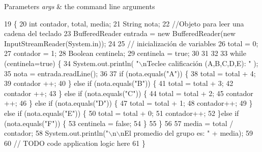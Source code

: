 \begin{DoxyParams}{Parameters}
{\em args} & the command line arguments \\
\hline
\end{DoxyParams}

\begin{DoxyCode}
19                                                               \{
20          \textcolor{keywordtype}{int} contador, total, media;
21       String nota;
22        \textcolor{comment}{//Objeto para leer una cadena del teclado}
23       BufferedReader entrada = \textcolor{keyword}{new} BufferedReader(\textcolor{keyword}{new} InputStreamReader(System.in));
24  
25       \textcolor{comment}{// inicialización de variables}
26       total = 0;
27       contador = 1;
28       Boolean centinela;
29       centinela = \textcolor{keyword}{true};
30       
31       
32   
33         \textcolor{keywordflow}{while} (centinela=\textcolor{keyword}{true}) \{
34          System.out.println( \textcolor{stringliteral}{"\(\backslash\)nTeclee calificación (A,B,C,D,E): "} );
35          nota = entrada.readLine();
36         
37          \textcolor{keywordflow}{if} (nota.equals(\textcolor{stringliteral}{"A"})) \{
38                 total = total + 4;
39                 contador ++;
40          \} \textcolor{keywordflow}{else} \textcolor{keywordflow}{if} (nota.equals(\textcolor{stringliteral}{"B"})) \{
41                 total = total + 3;
42                 contador ++;
43          \} \textcolor{keywordflow}{else} \textcolor{keywordflow}{if} (nota.equals(\textcolor{stringliteral}{"C"})) \{
44                 total = total + 2;
45                 contador ++;
46          \} \textcolor{keywordflow}{else} \textcolor{keywordflow}{if} (nota.equals(\textcolor{stringliteral}{"D"})) \{
47                 total = total + 1;
48                 contador++;
49          \} \textcolor{keywordflow}{else} \textcolor{keywordflow}{if} (nota.equals(\textcolor{stringliteral}{"E"})) \{
50                 total = total + 0;
51                 contador++;
52          \}\textcolor{keywordflow}{else} \textcolor{keywordflow}{if} (nota.equals(\textcolor{stringliteral}{"F"})) \{
53                 centinela = \textcolor{keyword}{false};
54          \}
55       \}
56   
57       media = total / contador;
58       System.out.println(\textcolor{stringliteral}{"\(\backslash\)n\(\backslash\)nEl promedio del grupo es: "} + media);
59     
60       \textcolor{comment}{// TODO code application logic here}
61     \}
\end{DoxyCode}
